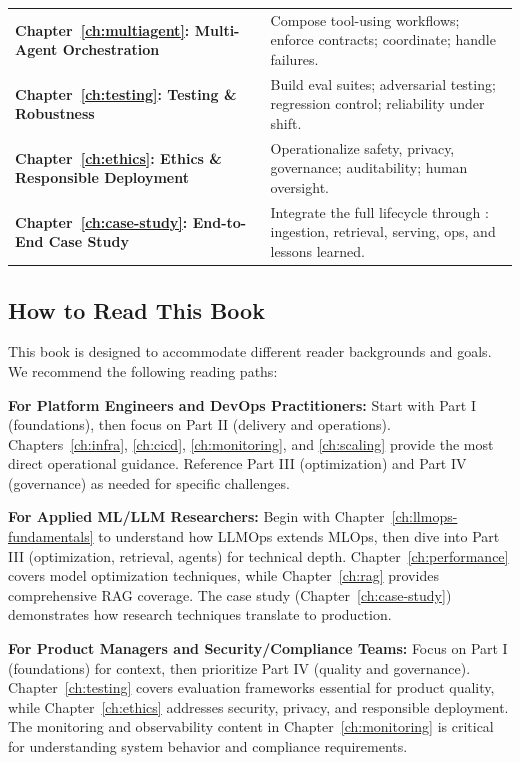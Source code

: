 \begin{table}[t]
\begin{tabularx}{\linewidth}{@{}p{52mm}X@{}}
\textbf{Chapter~\ref{ch:multiagent}: Multi-Agent Orchestration} &
Compose tool-using workflows; enforce contracts; coordinate; handle failures. \\

\textbf{Chapter~\ref{ch:testing}: Testing \& Robustness} &
Build eval suites; adversarial testing; regression control; reliability under shift. \\

\textbf{Chapter~\ref{ch:ethics}: Ethics \& Responsible Deployment} &
Operationalize safety, privacy, governance; auditability; human oversight. \\

\textbf{Chapter~\ref{ch:case-study}: End-to-End Case Study} &
Integrate the full lifecycle through \ishtar{}: ingestion, retrieval, serving, ops, and lessons learned. \\
\bottomrule
\end{tabularx}
\end{table}

\subsection{How to Read This Book}
\label{subsec:how-to-read}

This book is designed to accommodate different reader backgrounds and goals. We recommend the following reading paths:

\textbf{For Platform Engineers and DevOps Practitioners:} Start with Part I (foundations), then focus on Part II (delivery and operations). Chapters~\ref{ch:infra}, \ref{ch:cicd}, \ref{ch:monitoring}, and \ref{ch:scaling} provide the most direct operational guidance. Reference Part III (optimization) and Part IV (governance) as needed for specific challenges.

\textbf{For Applied ML/LLM Researchers:} Begin with Chapter~\ref{ch:llmops-fundamentals} to understand how LLMOps extends MLOps, then dive into Part III (optimization, retrieval, agents) for technical depth. Chapter~\ref{ch:performance} covers model optimization techniques, while Chapter~\ref{ch:rag} provides comprehensive RAG coverage. The \ishtar{} case study (Chapter~\ref{ch:case-study}) demonstrates how research techniques translate to production.

\textbf{For Product Managers and Security/Compliance Teams:} Focus on Part I (foundations) for context, then prioritize Part IV (quality and governance). Chapter~\ref{ch:testing} covers evaluation frameworks essential for product quality, while Chapter~\ref{ch:ethics} addresses security, privacy, and responsible deployment. The monitoring and observability content in Chapter~\ref{ch:monitoring} is critical for understanding system behavior and compliance requirements.

